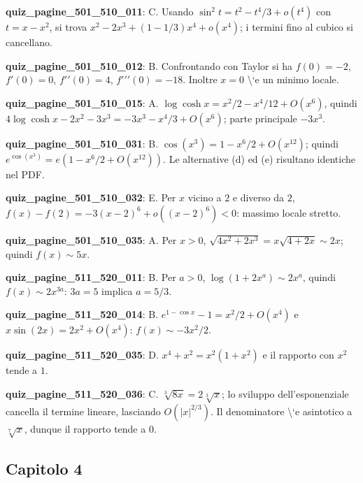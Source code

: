 \documentclass[11pt,a4paper]{article}
\newcounter{quiz}
\begin{document}
\noindent\textbf{quiz\_pagine\_501\_510\_011}: C. Usando $\sin^2t=t^2-t^4/3+o(t^4)$ con $t=x-x^2$, si trova $x^2-2x^3+(1-1/3)x^4+o(x^4)$; i termini fino al cubico si cancellano.\par\medskip
\noindent\textbf{quiz\_pagine\_501\_510\_012}: B. Confrontando con Taylor si ha $f(0)=-2$, $f\prime(0)=0$, $f\prime\prime(0)=4$, $f\prime\prime\prime(0)=-18$. Inoltre $x=0$ \textbackslash{}`e un minimo locale.\par\medskip
\noindent\textbf{quiz\_pagine\_501\_510\_015}: A. $\log\cosh x=x^2/2-x^4/12+O(x^6)$, quindi $4\log\cosh x-2x^2-3x^3=-3x^3-x^4/3+O(x^6)$; parte principale $-3x^3$.\par\medskip
\noindent\textbf{quiz\_pagine\_501\_510\_031}: B. $\cos(x^3)=1-x^6/2+O(x^{12})$; quindi $e^{\cos(x^3)}=e(1-x^6/2+O(x^{12}))$. Le alternative (d) ed (e) risultano identiche nel PDF.\par\medskip
\noindent\textbf{quiz\_pagine\_501\_510\_032}: E. Per $x$ vicino a $2$ e diverso da $2$, $f(x)-f(2)=-3(x-2)^6+o((x-2)^6)<0$: massimo locale stretto.\par\medskip
\noindent\textbf{quiz\_pagine\_501\_510\_035}: A. Per $x>0$, $\sqrt{4x^2+2x^3}=x\sqrt{4+2x}\sim2x$; quindi $f(x)\sim5x$.\par\medskip
\noindent\textbf{quiz\_pagine\_511\_520\_011}: B. Per $a>0$, $\log(1+2x^a)\sim2x^a$, quindi $f(x)\sim2x^{3a}$: $3a=5$ implica $a=5/3$.\par\medskip
\noindent\textbf{quiz\_pagine\_511\_520\_014}: B. $e^{1-\cos x}-1=x^2/2+O(x^4)$ e $x\sin(2x)=2x^2+O(x^4)$: $f(x)\sim-3x^2/2$.\par\medskip
\noindent\textbf{quiz\_pagine\_511\_520\_035}: D. $x^4+x^2=x^2(1+x^2)$ e il rapporto con $x^2$ tende a $1$.\par\medskip
\noindent\textbf{quiz\_pagine\_511\_520\_036}: C. $\sqrt[3]{8x}=2\sqrt[3]{x}$; lo sviluppo dell'esponenziale cancella il termine lineare, lasciando $O(|x|^{2/3})$. Il denominatore \textbackslash{}`e asintotico a $\sqrt[7]{x}$, dunque il rapporto tende a $0$.\par\medskip
\subsection*{Capitolo 4}
\end{document}
